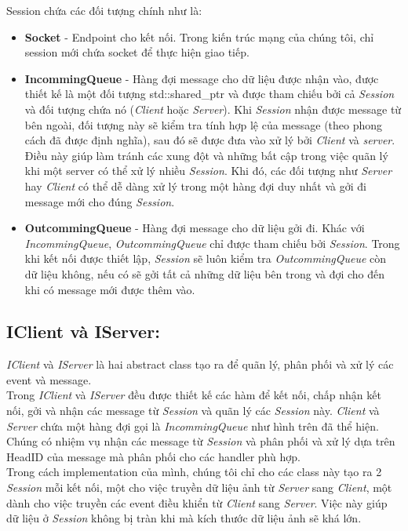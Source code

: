 Session chứa các đối tượng chính như là: 
\begin{itemize}
	\item \textbf{Socket} - Endpoint cho kết nối. Trong kiến trúc mạng của chúng tôi, chỉ session mới chứa socket để thực hiện giao tiếp.
	\item \textbf{IncommingQueue} - Hàng đợi message cho dữ liệu được nhận vào, được thiết kế là một đối tượng std::shared\_ptr và được tham chiếu bởi cả \textit{Session} và đối tượng chứa nó (\textit{Client} hoặc \textit{Server}). Khi \textit{Session} nhận được message từ bên ngoài, đối tượng này sẽ kiểm tra tính hợp lệ của message (theo phong cách đã được định nghĩa), sau đó sẽ được đưa vào xử lý bởi \textit{Client} và \textit{server}. Điều này giúp làm tránh các xung đột và những bất cập trong việc quãn lý khi một server có thể xử lý nhiều \textit{Session}. Khi đó, các đối tượng như \textit{Server} hay \textit{Client} có thể dễ dàng xử lý trong một hàng đợi duy nhất và gởi đi message mới cho đúng \textit{Session}.
	\item \textbf{OutcommingQueue} - Hàng đợi message cho dữ liệu gởi đi. Khác với \textit{IncommingQueue}, \textit{OutcommingQueue} chỉ được tham chiếu bởi \textit{Session}. Trong khi kết nối được thiết lập, \textit{Session} sẽ luôn kiểm tra \textit{OutcommingQueue} còn dữ liệu không, nếu có sẽ gởi tất cả những dữ liệu bên trong và đợi cho đến khi có message mới được thêm vào.
\end{itemize}

\subsection{IClient và IServer: }
\textit{IClient} và \textit{IServer} là hai abstract class tạo ra để quãn lý, phân phối và xử lý các event và message.  \\
Trong \textit{IClient} và \textit{IServer} đều được thiết kế các hàm để kết nối, chấp nhận kết nối, gởi và nhận các message từ \textit{Session} và quãn lý các \textit{Session} này. \textit{Client} và \textit{Server} chứa một hàng đợi gọi là \textit{IncommingQueue} như hình trên đã thể hiện. Chúng có nhiệm vụ nhận các message từ \textit{Session} và phân phối và xử lý dựa trên HeadID của message mà phân phối cho các handler phù hợp. \\
Trong cách implementation của mình, chúng tôi chỉ cho các class này tạo ra 2 \textit{Session} mỗi kết nối, một cho việc truyền dữ liệu ảnh từ \textit{Server} sang \textit{Client}, một dành cho việc truyền các event điều khiển từ \textit{Client} sang \textit{Server}. Việc này giúp dữ liệu ở \textit{Session} không bị tràn khi mà kích thước dữ liệu ảnh sẽ khá lớn. 


